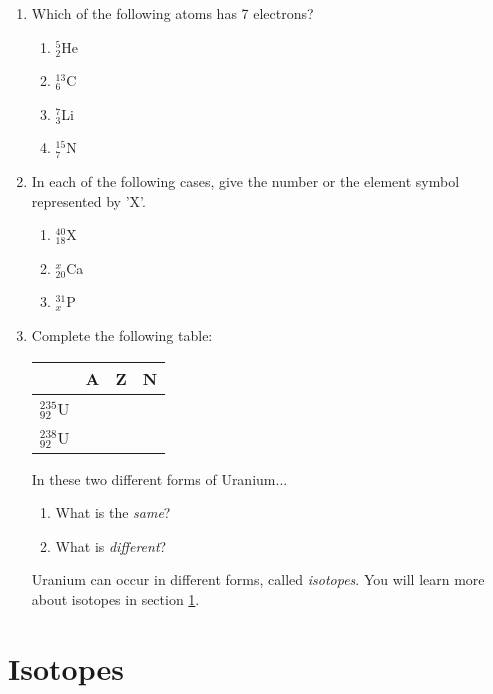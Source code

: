 {\begin{enumerate}
\item{Which of the following atoms has 7 electrons? 
	\begin{enumerate} 
	\item $^{5}_{2}$He 
	\item $^{13}_{6}$C 
	\item $ ^{7}_{3}$Li 
	\item$^{15}_{7}$N 
	\end{enumerate} 
}

\item{
In each of the following cases, give the number or the element symbol represented by 'X'.
	\begin{enumerate}
	\item{$^{40}_{18}$X}
	\item{$^{x}_{20}$Ca}
	\item{$^{31}_{x}$P}
	\end{enumerate}
}

\item{
Complete the following table:
\begin{center}
\begin{tabular}{|p{1.5cm}|p{1.5cm}|p{1.5cm}|p{1.5cm}|}\hline
 & \textbf{A} & \textbf{Z} & \textbf{N}\\\hline
$^{235}_{92}$U & & & \\\hline
$^{238}_{92}$U & & & \\\hline
\end{tabular}
\end{center}

In these two different forms of Uranium...

	\begin{enumerate}
	\item{What is the \textit{same}?}
	\item{What is \textit{different}?}
	\end{enumerate}

Uranium can occur in different forms, called \textit{isotopes}. You will learn more about isotopes in section \ref{sec:atom:isotopes}.
}
\end{enumerate}
}






\section{Isotopes}
\label{sec:atom:isotopes}

